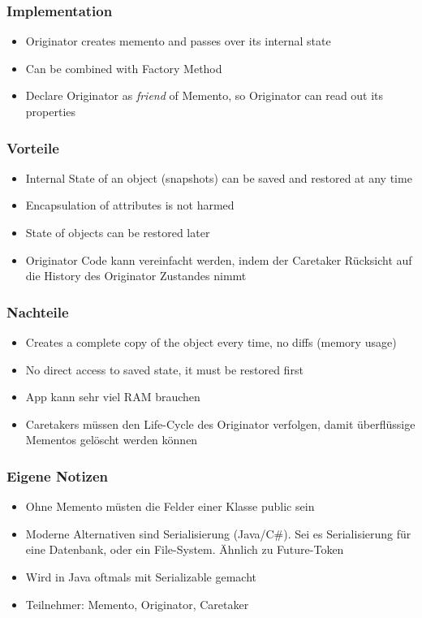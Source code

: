 \subsubsection{Implementation}
\begin{itemize}[topsep=0pt]
    \itemsep -0.4em
    \item Originator creates memento and passes over its internal state
    \item Can be combined with Factory Method
    \item Declare Originator as \textit{friend} of Memento, so Originator can read out its properties
\end{itemize}
\subsubsection{Vorteile}
\begin{itemize}[topsep=0pt]
    \itemsep -0.4em
    \item Internal State of an object (snapshots) can be saved and restored at any time
    \item Encapsulation of attributes is not harmed
    \item State of objects can be restored later
    \item Originator Code kann vereinfacht werden, indem der Caretaker Rücksicht auf die History des Originator Zustandes nimmt
\end{itemize}
\subsubsection{Nachteile}
\begin{itemize}[topsep=0pt]
    \itemsep -0.4em
    \item Creates a complete copy of the object every time, no diffs (memory usage)
    \item No direct access to saved state, it must be restored first
    \item App kann sehr viel RAM brauchen
    \item Caretakers müssen den Life-Cycle des Originator verfolgen, damit überflüssige Mementos gelöscht werden können
\end{itemize}
\subsubsection{Eigene Notizen}
\begin{itemize}[topsep=0pt]
    \itemsep -0.4em
    \item Ohne Memento müsten die Felder einer Klasse public sein
    \item Moderne Alternativen sind Serialisierung (Java/C\#). Sei es Serialisierung für eine Datenbank, oder ein File-System. Ähnlich zu Future-Token
    \item Wird in Java oftmals mit Serializable gemacht
    \item Teilnehmer: Memento, Originator, Caretaker
\end{itemize}

